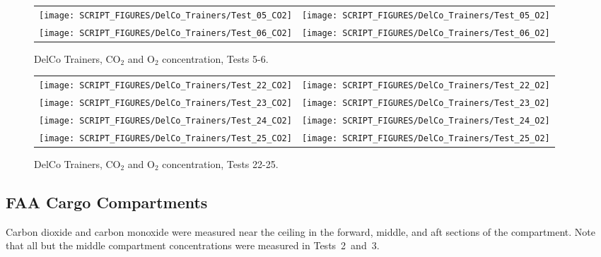 \newpage

\begin{figure}[p]
\begin{tabular*}{\textwidth}{l@{\extracolsep{\fill}}r}
\texttt{[image: SCRIPT\_FIGURES/DelCo\_Trainers/Test\_05\_CO2]} &
\texttt{[image: SCRIPT\_FIGURES/DelCo\_Trainers/Test\_05\_O2]} \\
\texttt{[image: SCRIPT\_FIGURES/DelCo\_Trainers/Test\_06\_CO2]} &
\texttt{[image: SCRIPT\_FIGURES/DelCo\_Trainers/Test\_06\_O2]}
\end{tabular*}
\caption[DelCo Trainers, CO$_2$ and O$_2$ concentration, Tests 5-6]{DelCo Trainers, CO$_2$ and O$_2$ concentration, Tests 5-6.}
\label{DelCo_CO2_O2_2}
\end{figure}

\begin{figure}[p]
\begin{tabular*}{\textwidth}{l@{\extracolsep{\fill}}r}
\texttt{[image: SCRIPT\_FIGURES/DelCo\_Trainers/Test\_22\_CO2]} &
\texttt{[image: SCRIPT\_FIGURES/DelCo\_Trainers/Test\_22\_O2]} \\
\texttt{[image: SCRIPT\_FIGURES/DelCo\_Trainers/Test\_23\_CO2]} &
\texttt{[image: SCRIPT\_FIGURES/DelCo\_Trainers/Test\_23\_O2]} \\
\texttt{[image: SCRIPT\_FIGURES/DelCo\_Trainers/Test\_24\_CO2]} &
\texttt{[image: SCRIPT\_FIGURES/DelCo\_Trainers/Test\_24\_O2]} \\
\texttt{[image: SCRIPT\_FIGURES/DelCo\_Trainers/Test\_25\_CO2]} &
\texttt{[image: SCRIPT\_FIGURES/DelCo\_Trainers/Test\_25\_O2]}
\end{tabular*}
\caption[DelCo Trainers, CO$_2$ and O$_2$ concentration, Tests 22-25]{DelCo Trainers, CO$_2$ and O$_2$ concentration, Tests 22-25.}
\label{DelCo_CO2_O2_3}
\end{figure}


\clearpage

\subsection{FAA Cargo Compartments}

Carbon dioxide and carbon monoxide were measured near the ceiling in the forward, middle, and aft sections of the compartment. Note that all but the middle compartment concentrations were measured in Tests~2~and~3.


